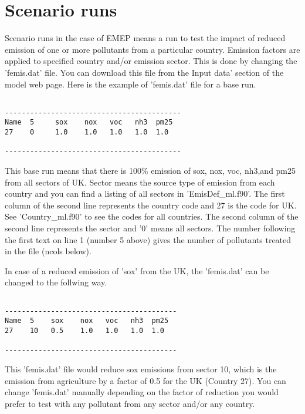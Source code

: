 \section{Scenario runs}

Scenario runs in the case of EMEP means a run to test the impact of reduced emission of
one or more pollutants from a particular country.  Emission factors
are applied to specified country and/or emission sector.  This is done by
changing the 'femis.dat' file. You can download this file from the Input
data' section of the model web page.  Here is the example of 'femis.dat'
file for a base run. 

\begin{verbatim}

------------------------------------------
Name  5     sox    nox   voc   nh3  pm25
27    0     1.0    1.0   1.0   1.0  1.0  

------------------------------------------

\end{verbatim}

This base run means that there is 100\% emission of sox, nox, voc,
nh3,and pm25 from all sectors of UK.  Sector means the source type of
emission from each country and you can find a listing of all sectors
in 'EmisDef\_ml.f90'.  The first column of the second
line represents the country code and 27 is the code for UK.  See
'Country\_ml.f90' to see the codes for all countries.  The second
column of the second line 
represents the sector and '0' means all sectors.  The number following
the first text on line 1 (number 5 above) gives the number of
pollutants treated in the file (ncols below).   
              

In case of a reduced emission of 'sox' from the UK, the 'femis.dat' can be
changed to the follwing way. 

\begin{verbatim}

-----------------------------------------
Name  5    sox    nox   voc   nh3  pm25 
27    10   0.5    1.0   1.0   1.0  1.0   

-----------------------------------------

\end{verbatim}        

This 'femis.dat' file would reduce sox emissions from sector 10, which
is the emission from  agriculture by a
factor of 0.5 for the UK (Country 27).  You can change 'femis.dat'
manually depending on the factor of
reduction you would prefer to test with any pollutant from any sector
and/or any country. 

